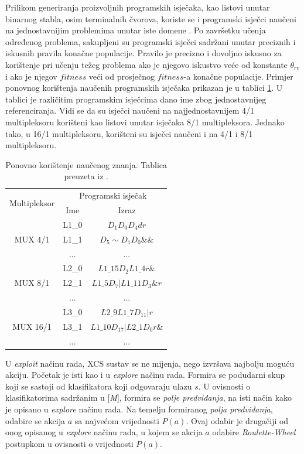 \documentclass[times, utf8, zavrsni]{fer}
\begin{document}
Prilikom generiranja proizvoljnih programskih isječaka, kao listovi unutar binarnog stabla, osim terminalnih čvorova, koriste se i programski isječci naučeni na jednostavnijim problemima unutar iste domene \citep{4}.
Po završetku učenja određenog problema, sakupljeni su programski isječci sadržani unutar preciznih i iskusnih pravila konačne populacije.
Pravilo je precizno i dovoljno iskusno za korištenje pri učenju težeg problema ako je njegovo iskustvo veće od konstante $\theta_{re}$ i ako je njegov $fitness$ veći od prosječnog $fitness$-a konačne populacije.
Primjer ponovnog korištenja naučenih programskih isječaka prikazan je u tablici \ref{tbl:reuse}.
U tablici je različitim programskim isječcima dano ime zbog jednostavnijeg referenciranja.
Vidi se da su isječci naučeni na najjednostavnijem 4/1 multipleksoru korišteni kao listovi unutar isječaka 8/1 multipleksora.
Jednako tako, u 16/1 multipleksoru, korišteni su isječci naučeni i na 4/1 i 8/1 multipleksoru.
\begin{table}[!htb]
    \caption{Ponovno korištenje naučenog znanja. Tablica preuzeta iz \citep{4}.}
    \label{tbl:reuse}
    \centering
    \begin{tabular}{c | c | c}
        \multirow{2}{*}{Multipleksor} & \multicolumn{2}{c}{Programski isječak} \\
        & Ime & Izraz \\ \hline
        \multirow{3}{*}{MUX 4/1} & L1\_0 & $D_{1}D_{0}D_{4}dr$ \\
        & L1\_1 & $D_{5}\sim D_{1}D_{0}\&\&$ \\
        & ... & ... \\ \hline
        \multirow{3}{*}{MUX 8/1} & L2\_0 & $L1\_15D_{2}L1\_4r\&$ \\
        & L2\_1 & $L1\_5D_{7}|L1\_11D_{3}\&r$ \\
        & ... & ... \\ \hline
        \multirow{3}{*}{MUX 16/1} & L3\_0 & $L2\_9L1\_7D_{11}|r$ \\
        & L3\_1 & $L1\_10D_{17}|L2\_1D_{0}r\&$ \\
        & ... & ... \\
    \end{tabular}
\end{table}

U \emph{exploit} načinu rada, XCS sustav se ne mijenja, nego izvršava najbolju moguću akciju.
Početak je isti kao i u \emph{explore} načinu rada.
Formira se podudarni skup koji se sastoji od klasifikatora koji odgovaraju ulazu $s$.
U ovisnosti o klasifikatorima sadržanim u [\emph{M}], formira se \emph{polje predviđanja}, na isti način kako je opisano u \emph{explore} načinu rada.
Na temelju formiranog \emph{polja predviđanja}, odabire se akcija $a$ sa najvećom vrijednosti $P(a)$.
Ovaj odabir je drugačiji od onog opisanog u \emph{explore} načinu rada, u kojem se akcija $a$ odabire \emph{Roulette-Wheel} postupkom u ovisnosti o vrijednosti $P(a)$.
\end{document}
